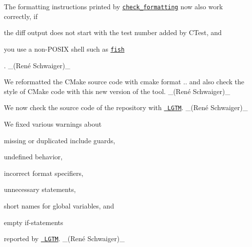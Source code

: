 \begin{DoxyItemize}
\item The formatting instructions printed by \href{https://master.libelektra.org/tests/shell/check_formatting.sh}{\texttt{ {\ttfamily check\+\_\+formatting}}} now also work correctly, if
\begin{DoxyItemize}
\item the {\ttfamily diff} output does not start with the test number added by C\+Test, and
\item you use a non-\/\+P\+O\+S\+IX shell such as \href{https://fishshell.com}{\texttt{ {\ttfamily fish}}}
\end{DoxyItemize}

. \+\_\+(René Schwaiger)\+\_\+
\item We reformatted the C\+Make source code with cmake format {..} and also check the style of C\+Make code with this new version of the tool. \+\_\+(René Schwaiger)\+\_\+
\item We now check the source code of the repository with \href{https://lgtm.com}{\texttt{ L\+G\+TM}}. \+\_\+(René Schwaiger)\+\_\+
\item We fixed various warnings about
\begin{DoxyItemize}
\item missing or duplicated include guards,
\item undefined behavior,
\item incorrect format specifiers,
\item unnecessary statements,
\item short names for global variables, and
\item empty {\ttfamily if}-\/statements
\end{DoxyItemize}

reported by \href{https://lgtm.com}{\texttt{ L\+G\+TM}}. \+\_\+(René Schwaiger)\+\_\+
\end{DoxyItemize}


